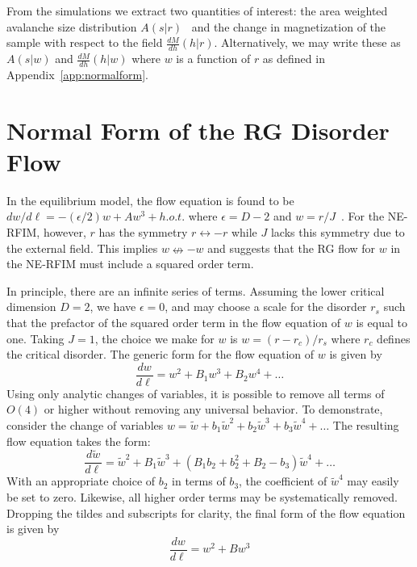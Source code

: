\documentclass[reprint,amsmath,amssymb,aps,floatfix]{revtex4-1}
\begin{document}
%
From the simulations we extract two quantities of interest: the area weighted avalanche size distribution $A(s|r)$~\cite{Chen11} and the change in magnetization of the sample with respect to the field $\frac{dM}{dh}(h|r)$. Alternatively, we may write these as $A(s|w)$ and $\frac{dM}{dh}(h|w)$ where $w$ is a function of $r$ as defined in Appendix~\ref{app:normalform}. 

\section{\label{app:normalform} Normal Form of the RG Disorder Flow}
In the equilibrium model, the flow equation is found to be $dw/d\ell=-(\epsilon/2)w+Aw^3+h.o.t.$ where $\epsilon=D-2$ and $w=r/J$~\cite{BrayMoore85}. For the NE-RFIM, however, $r$ has the symmetry $r \leftrightarrow -r$ while $J$ lacks this symmetry due to the external field. This implies $w \nleftrightarrow -w$ and suggests that the RG flow for $w$ in the NE-RFIM must include a squared order term.\par
%
In principle, there are an infinite series of terms.  Assuming the lower critical dimension $D=2$, we have $\epsilon=0$, and may choose a scale for the disorder $r_s$ such that the prefactor of the squared order term in the flow equation of $w$ is equal to one. Taking $J=1$, the choice we make for $w$ is $w=(r-r_c)/r_s$ where $r_c$ defines the critical disorder. The generic form for the flow equation of $w$ is given by
%
\begin{equation}
	\frac{dw}{d\ell}=w^2+B_1 w^3+ B_2 w^4 + \dots 
\end{equation}
%
\noindent Using only analytic changes of variables, it is possible to remove all terms of $O(4)$ or higher without removing any universal behavior. To demonstrate, consider the change of variables $w = \tilde{w} + b_1\tilde{w}^2+b_2\tilde{w}^3+b_3\tilde{w}^4+\dots$ The resulting flow equation takes the form:
%
\begin{equation}
	\frac{d\tilde{w}}{d\ell}=\tilde{w}^2+B_1 \tilde{w}^3+ (B_1b_2+b_2^2+B_2-b_3) \tilde{w}^4 + \dots
\end{equation} 
%
\noindent With an appropriate choice of $b_2$ in terms of $b_3$, the coefficient of $\tilde{w}^4$ may easily be set to zero. Likewise, all higher order terms may be systematically removed. Dropping the tildes and subscripts for clarity, the final form of the flow equation is given by 
%
\begin{equation}
	\label{eq:TruncNF}
	\frac{dw}{d\ell}=w^2+B w^3
\end{equation}
\end{document}
